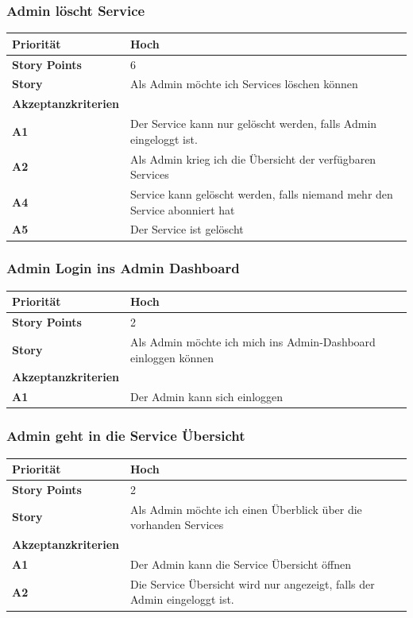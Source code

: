 \documentclass[11pt]{scrartcl}
\begin{document}
 \subsubsection{Admin löscht Service}
 
  \begin{tabularx}{\linewidth}{l X}
  \textbf{Priorität} & Hoch\\
  \hline
  \textbf{Story Points} & 6\\
  \hline
  \textbf{Story}& Als Admin möchte ich Services löschen können\\
  \hline
    \textbf{Akzeptanzkriterien} & \\
    \hline
      \textbf{A1} & Der Service kann nur gelöscht werden, falls Admin eingeloggt ist.\\
  \hline
  \textbf{A2} & Als Admin krieg ich die Übersicht der verfügbaren Services\\
  \hline
  \textbf{A4} & Service kann gelöscht werden, falls niemand mehr den Service abonniert hat\\
  \hline
    \textbf{A5} & Der Service ist gelöscht\\
  \hline
 \end{tabularx}
 
 \subsubsection{Admin Login ins Admin Dashboard}
   \begin{tabularx}{\linewidth}{l X}
  \textbf{Priorität} & Hoch\\
  \hline
  \textbf{Story Points} & 2\\
  \hline
  \textbf{Story}& Als Admin möchte ich mich ins Admin-Dashboard einloggen können\\
  \hline
    \textbf{Akzeptanzkriterien} & \\
    \hline
      \textbf{A1} & Der Admin kann sich einloggen\\
  \hline
 \end{tabularx}

 \subsubsection{Admin geht in die Service Übersicht}
 
    \begin{tabularx}{\linewidth}{l X}
  \textbf{Priorität} & Hoch\\
  \hline
  \textbf{Story Points} & 2\\
  \hline
  \textbf{Story}& Als Admin möchte ich einen Überblick über die vorhanden Services\\
  \hline
    \textbf{Akzeptanzkriterien} & \\
    \hline
      \textbf{A1} & Der Admin kann die Service Übersicht öffnen\\
  \hline
    \textbf{A2} & Die Service Übersicht wird nur angezeigt, falls der Admin eingeloggt ist.\\
  \hline
 \end{tabularx}
\end{document}
